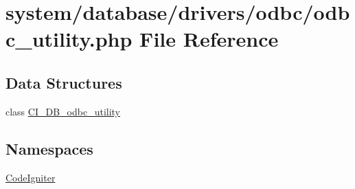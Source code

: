 \hypertarget{odbc__utility_8php}{}\section{system/database/drivers/odbc/odbc\+\_\+utility.php File Reference}
\label{odbc__utility_8php}
\subsection*{Data Structures}
\begin{DoxyCompactItemize}
\item 
class \mbox{\hyperlink{class_c_i___d_b__odbc__utility}{C\+I\+\_\+\+D\+B\+\_\+odbc\+\_\+utility}}
\end{DoxyCompactItemize}
\subsection*{Namespaces}
\begin{DoxyCompactItemize}
\item 
 \mbox{\hyperlink{namespace_code_igniter}{Code\+Igniter}}
\end{DoxyCompactItemize}
